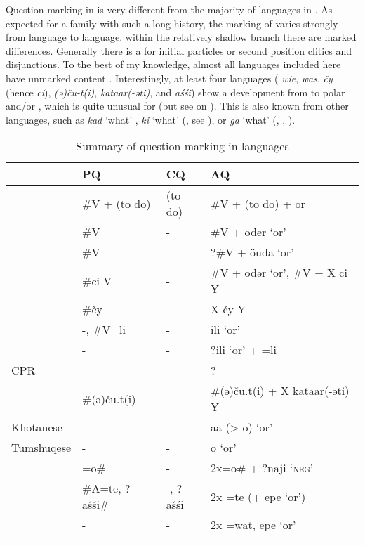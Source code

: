Question marking in  is very different from the majority of languages in . As expected for a family with such a long history, the marking of  varies strongly from language to language.  within the relatively shallow  branch there are marked differences. Generally there is a  for initial particles or second position clitics and disjunctions. To the best of my knowledge, almost all  languages included here have unmarked content . Interestingly, at least four languages ( \textit{wie}, \textit{was},  \textit{čy} (hence  \textit{ci}),  \textit{(ə)ču-t(i)}, \textit{kataar(-əti)}, and  \textit{aśśi}) show a development from  to polar  and/or , which is quite unusual for  (but see  on ). This is also known from other  languages, such as  \textit{kad} ‘what’ \citep[100]{Hackstein2013},  \textit{ki} ‘what’ (\citealt{Thompson2012}, see ), or  \textit{ga} ‘what’ (\citealt{Liljegren2016}, , ).

\begin{table}
\caption{Summary of question marking in  languages}
\label{tab:indo:1}

\begin{tabularx}{\textwidth}{QQQl}
\lsptoprule
& \textbf{PQ} & \textbf{CQ} & \textbf{AQ}\\
\midrule
{} & \#V + (to do) & (to do) & \#V + (to do) + or\\
 & \#V & - & \#V + oder ‘or’\\
 & \#V & - & ?\#V + öuda ‘or’\\
 & \#ci V & - & \#V + odər ‘or’, \#V + X ci Y\\
 & \#čy & - & X čy Y\\
 & -, \#V=li & - & ili ‘or’\\
 & - & - & ?ili ‘or’ + =li\\
CPR & - & - & ?\\
 & \#(ə)ču.t(i) & - & \#(ə)ču.t(i) + X kataar(-əti) Y\\
Khotanese & - & - & aa (> o) ‘or’\\
Tumshuqese & - & - & o ‘or’\\
 & =o\# & - & 2x=o\# + ?naji ‘\textsc{neg}’\\
 & \#A=te, ?aśśi\# & -, ?aśśi & 2x =te (+ epe ‘or’)\\
 & - & - & 2x =wat, epe ‘or’\\
\lspbottomrule
\end{tabularx}
\end{table}

